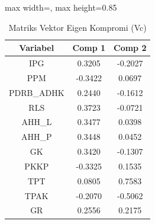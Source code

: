 \begin{table}[H]
\centering
\caption{Matriks Vektor Eigen Kompromi (Vc)} \label{tab:appvc}
\begin{adjustbox}{max width=\textwidth, max height=0.85\textheight}
\begin{tabular}{|c|c|c|}
\hline
\textbf{Variabel} & \textbf{Comp 1} & \textbf{Comp 2} \\
\hline
IPG & 0.3205 & -0.2027 \\
PPM & -0.3422 & 0.0697 \\
PDRB\_ADHK & 0.2440 & -0.1612 \\
RLS & 0.3723 & -0.0721 \\
AHH\_L & 0.3477 & 0.0398 \\
AHH\_P & 0.3448 & 0.0452 \\
GK & 0.3420 & -0.1307 \\
PKKP & -0.3325 & 0.1535 \\
TPT & 0.0805 & 0.7583 \\
TPAK & -0.2070 & -0.5062 \\
GR & 0.2556 & 0.2175 \\
\hline
\end{tabular}
\end{adjustbox}
\end{table}